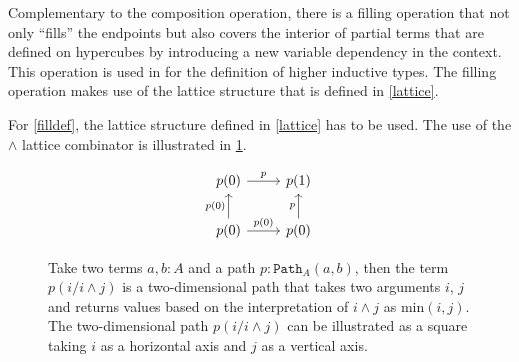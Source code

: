 \documentclass[12pt,a4paper,twoside,xetex]{book} %
\newcommand{\op}[1]{\mathtt{#1}}
\newcommand{\pa}[3]{\op{Path}_{#1}\left(#2, #3\right)}
\begin{document}
Complementary to the composition operation, there is a filling operation that 
not only ``fills'' the endpoints but also covers the interior of partial terms 
that are defined on hypercubes by introducing a new variable dependency in the 
context. This operation is used in \cite{Coquand2018} for the definition of 
higher inductive types. The filling operation makes use of the lattice 
structure that is defined in \cref{lattice}. 


% 
% 
%  
% 
%  
%  

% 
% 
% 
% 

For \cref{filldef}, the lattice structure defined in \cref{lattice} has to be 
used. The use of the $\wedge$ lattice combinator is illustrated in 
\cref{twopath}.

\begin{figure}\label{twopath}
\centering
\[ \begin{tikzcd}
p (0) \arrow[r, "p" ] 
& p(1)  \\
p(0) 	\arrow[u, "p(0)"]	
	\arrow[r, "p(0)"]
& p(0)  \arrow[u, "p"] 
\end{tikzcd}
\]
\caption{Take two terms $a,b:A$ and a path $p : \pa{A}{a}{b}$, then the term 
$p(i/i\wedge j)$ is a two-dimensional path that takes two arguments $i$, $j$ 
and returns values based on the interpretation of $i \wedge j$ as 
$\text{min}(i,j)$. The two-dimensional path $p(i/i\wedge j)$ can be 
illustrated as a square taking $i$ as a horizontal axis and $j$ as a vertical axis.}
\end{figure}
\end{document}
